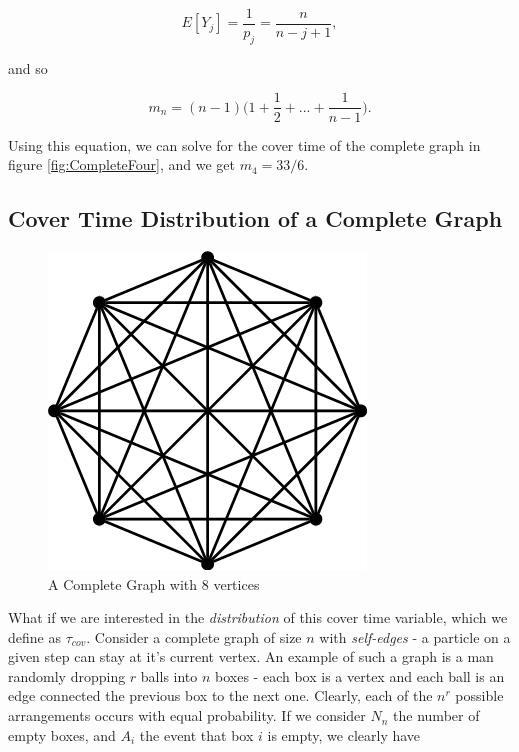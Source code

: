 \documentclass[11pt]{article}
\begin{document}
\begin{equation}
E[Y_{j}] = \frac{1}{p_{j}} = \frac{n}{n-j+1},
\end{equation}

\noindent and so

\begin{equation}
m_{n} = (n-1)\bigg(1 + \frac{1}{2} + ... + \frac{1}{n-1}\bigg).
\end{equation}

Using this equation, we can solve for the cover time of the complete graph in figure \ref{fig:CompleteFour}, and we get $m_{4} = 33/6$. 
\cite{BG}



\subsection{Cover Time Distribution of a Complete Graph}

\begin{figure}[h]
\centering
\includegraphics[scale = 0.3]{CompleteGraph}
\caption{A Complete Graph with 8 vertices}
\label{fig:CompleteEight}
\end{figure}

\indent \indent What if we are interested in the \textit{distribution} of this cover time variable, which we define as $\tau_{cov}$. Consider a complete graph of size $n$ with \textit{self-edges} - a particle on a given step can stay at it's current vertex. An example of such a graph is a man randomly dropping $r$ balls into $n$ boxes - each box is a vertex and each ball is an edge connected the previous box to the next one. Clearly, each of the $n^{r}$ possible arrangements occurs with equal probability. If we consider $N_{n}$ the number of empty boxes, and $A_{i}$ the event that box $i$ is empty, we clearly have
\end{document}
